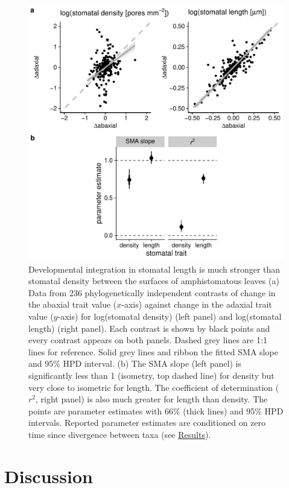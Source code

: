 \documentclass[
  12pt,
]{article}
\begin{document}
\begin{figure}[ht]
\includegraphics[width=\textwidth]{../figures/h2.pdf}
\caption{Developmental integration in stomatal length is much stronger than stomatal density between the surfaces of amphistomatous leaves (a) Data from 236 phylogenetically independent contrasts of change in the abaxial trait value ($x$-axis) against change in the adaxial trait value ($y$-axis) for log(stomatal density) (left panel) and log(stomatal length) (right panel). Each contrast is shown by black points and every contrast appears on both panels. Dashed grey lines are 1:1 lines for reference. Solid grey lines and ribbon the fitted SMA slope and 95\% HPD interval. (b) The SMA slope (left panel) is significantly less than 1 (isometry, top dashed line) for density but very close to isometric for length. The coefficient of determination ($r^2$, right panel) is also much greater for length than density. The points are parameter estimates with 66\% (thick lines) and 95\% HPD intervals. Reported parameter estimates are conditioned on zero time since divergence between taxa (see \protect\hyperlink{results}{Results}).}
\label{fig:h2}
\end{figure}

\hypertarget{discussion}{%
\section{Discussion}\label{discussion}}
\end{document}

